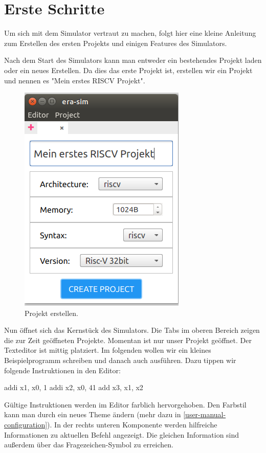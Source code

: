 
\section{Erste Schritte}


Um sich mit dem Simulator vertraut zu machen, folgt hier eine kleine Anleitung
zum Erstellen des ersten Projekts und einigen Features des Simulators.

Nach dem Start des Simulators kann man entweder ein bestehendes Projekt laden
oder ein neues Erstellen. Da dies das erste Projekt ist, erstellen wir ein
Projekt und nennen es "Mein erstes RISCV Projekt".

\begin{figure}[H]
	\centering
	\includegraphics[scale=1.0]{Images/first-steps-1.png}
	\caption{Projekt erstellen.}
\end{figure}

Nun öffnet sich das Kernstück des Simulators. Die Tabs im oberen Bereich zeigen
die zur Zeit geöffneten Projekte. Momentan ist nur unser Projekt geöffnet. Der
Texteditor ist mittig platziert. Im folgenden wollen wir ein kleines
Beispielprogramm schreiben und danach auch ausführen. Dazu tippen wir folgende
Instruktionen in den Editor:

\begin{riscv}
                                        addi x1, x0,  1
                                        addi x2, x0, 41
                                        add  x3, x1, x2
\end{riscv}
Gültige Instruktionen werden im Editor farblich hervorgehoben. Den Farbstil kann
man durch ein neues Theme ändern (mehr dazu in
\autoref{user-manual-configuration}). In der rechts unteren Komponente werden
hilfreiche Informationen zu aktuellen Befehl angezeigt. Die gleichen Information
sind außerdem über das Fragezeichen-Symbol zu erreichen.

